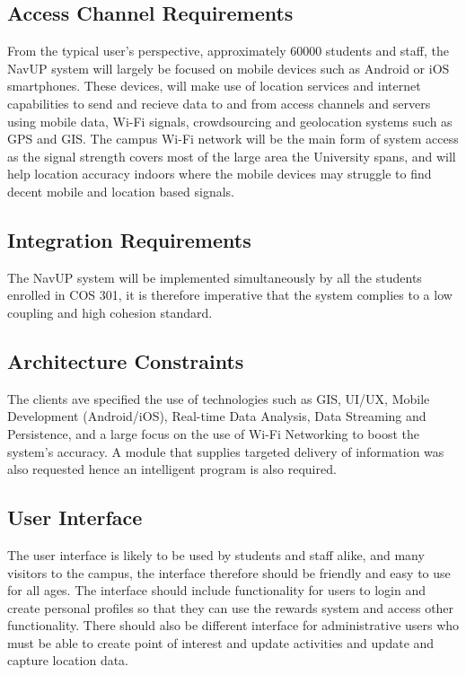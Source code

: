 \documentclass[11pt, a4paper]{article}
\begin{document}
			\subsection{Access Channel Requirements}
				From the typical user's perspective,  approximately 60000 students and staff,  the NavUP system will largely be focused on mobile devices such as Android or iOS smartphones.
				These devices,  will make use of location services and internet capabilities to send and recieve data to and from access channels and servers using mobile data, 
				Wi-Fi signals,  crowdsourcing and geolocation systems such as GPS and GIS. The campus Wi-Fi network will be the main form of system access as the signal
				strength covers most of the large area the University spans,  and will help location accuracy indoors where the mobile devices may struggle to find decent mobile
				and location based signals.

			
			
			\subsection{Integration Requirements}
				The NavUP system will be implemented simultaneously by all the students enrolled in COS 301,  it is therefore imperative that the system complies to a low coupling and high cohesion standard.
			\subsection{Architecture Constraints}
				The clients ave specified the use of technologies such as GIS,  UI/UX,  Mobile Development (Android/iOS),   Real-time Data Analysis,  Data Streaming and
				Persistence,  and a large focus on the use of Wi-Fi Networking to boost the system's accuracy. A module that supplies targeted delivery of information was also requested hence an intelligent program is also required.
				
			\subsection{User Interface}
				The user interface is likely to be used by students and staff alike,  and many visitors to the campus,  the interface therefore should be friendly and easy to use for all ages. The interface should include functionality for users to login and create personal profiles
				so that they can use the rewards system and access other functionality. There should also be different interface for administrative users who must be able to create point of interest and update activities and update and capture location data.
\end{document}
